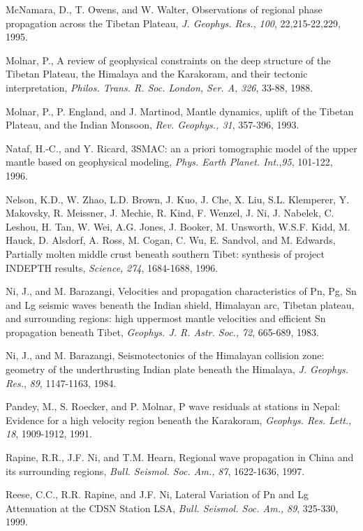 \documentclass[12pt]{article}
\begin{document}
\begin{references}
McNamara, D., T. Owens, and W. Walter, Observations of
regional phase propagation across the Tibetan Plateau, {\it J. Geophys. Res.,}
{\it 100}, 22,215-22,229, 1995.

Molnar, P., A review of geophysical constraints on the deep structure
of the Tibetan Plateau, the Himalaya and the Karakoram, and their tectonic
interpretation, {\it Philos. Trans. R. Soc. London, Ser. A,} {\it 326}, 33-88,
1988.

Molnar, P., P. England, and J. Martinod, Mantle dynamics, uplift of the
Tibetan Plateau, and the Indian Monsoon, {\it Rev. Geophys., 31}, 357-396, 1993.

Nataf, H.-C., and Y. Ricard, {3SMAC: an a priori tomographic
model of the upper mantle based on geophysical modeling}, {\it
Phys. Earth Planet. Int.},{\it 95}, {101-122}, 1996.

Nelson, K.D., W. Zhao, L.D. Brown, J. Kuo, J. Che, X. Liu, S.L. Klemperer,
Y. Makovsky, R. Meissner, J. Mechie, R. Kind, F. Wenzel, J. Ni, J. Nabelek,
C. Leshou, H. Tan, W. Wei, A.G. Jones, J. Booker, M. Unsworth, W.S.F. Kidd,
M. Hauck, D. Alsdorf, A. Ross, M. Cogan, C. Wu, E. Sandvol, and M. Edwards,
Partially molten middle crust beneath southern Tibet: synthesis of
project INDEPTH results, {\it Science,} {\it 274}, 1684-1688, 1996.

Ni, J., and M. Barazangi, Velocities and propagation characteristics
of Pn, Pg, Sn and Lg seismic waves beneath the Indian shield, Himalayan arc,
Tibetan plateau, and surrounding regions: high uppermost mantle velocities
and efficient Sn propagation beneath Tibet, {\it Geophys. J. R. Astr. Soc.,}
{\it 72}, 665-689, 1983.

Ni, J., and M. Barazangi, Seismotectonics of the Himalayan collision zone:
geometry of the underthrusting Indian plate beneath the Himalaya, {\it J.
Geophys. Res.}, {\it 89}, 1147-1163, 1984.

Pandey, M., S. Roecker, and P. Molnar, P wave residuals at stations in
Nepal: Evidence for a high velocity region beneath the Karakoram, {\it Geophys.
Res. Lett.,} {\it 18}, 1909-1912, 1991.



Rapine, R.R., J.F. Ni, and T.M. Hearn, Regional wave propagation in China
and its surrounding regions, {\it Bull. Seismol. Soc. Am.,} {\it 87},
1622-1636, 1997.

Reese, C.C., R.R. Rapine, and J.F. Ni, Lateral Variation of Pn and Lg
Attenuation at the CDSN Station LSA, {\it Bull. Seismol. Soc. Am.,} {\it 89},
325-330, 1999.


\end{references}
\end{document}
